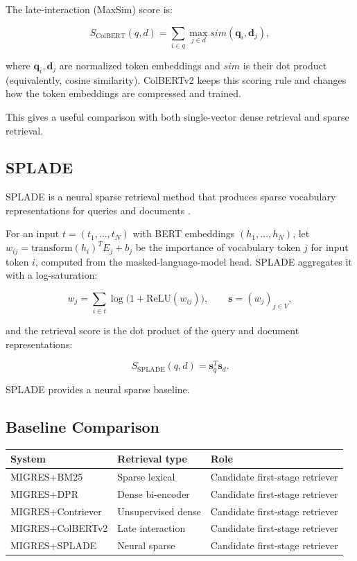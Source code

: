 \documentclass[11pt,a4paper]{article}
\begin{document}
The late-interaction (MaxSim) score is:

\[
S_{\mathrm{ColBERT}}(q,d)
=
\sum_{i\in q}
\max_{j\in d}
sim(\mathbf q_i,\mathbf d_j),
\]

where $\mathbf q_i,\mathbf d_j$ are normalized token embeddings and $sim$ is their dot product (equivalently, cosine similarity). ColBERTv2 keeps this scoring rule and changes how the token embeddings are compressed and trained.

This gives a useful comparison with both single-vector dense retrieval and sparse retrieval.

\subsection{SPLADE}

SPLADE is a neural sparse retrieval method that produces sparse vocabulary representations for queries and documents \citep{formal-etal-2021-splade}.

For an input $t=(t_1,\ldots,t_N)$ with BERT embeddings $(h_1,\ldots,h_N)$, let $w_{ij}=\mathrm{transform}(h_i)^TE_j+b_j$ be the importance of vocabulary token $j$ for input token $i$, computed from the masked-language-model head. SPLADE aggregates it with a log-saturation:

\[
w_j=\sum_{i\in t}\log\big(1+\mathrm{ReLU}(w_{ij})\big),
\qquad
\mathbf{s}=(w_j)_{j\in V},
\]

and the retrieval score is the dot product of the query and document representations:

\[
S_{\mathrm{SPLADE}}(q,d)
=
\mathbf{s}_q^T\mathbf{s}_d.
\]

SPLADE provides a neural sparse baseline.

\subsection{Baseline Comparison}

\begin{center}
\begin{tabular}{lll}
\toprule
\textbf{System} & \textbf{Retrieval type} & \textbf{Role}\\
\midrule
MIGRES+BM25 & Sparse lexical & Candidate first-stage retriever\\
MIGRES+DPR & Dense bi-encoder & Candidate first-stage retriever\\
MIGRES+Contriever & Unsupervised dense & Candidate first-stage retriever\\
MIGRES+ColBERTv2 & Late interaction & Candidate first-stage retriever\\
MIGRES+SPLADE & Neural sparse & Candidate first-stage retriever\\
\bottomrule
\end{tabular}
\end{center}
\end{document}
